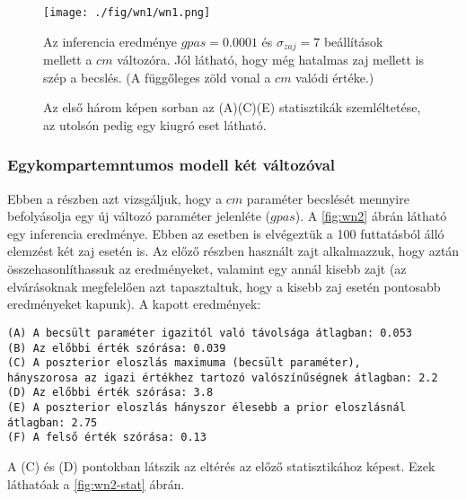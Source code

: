 \begin{figure}[!htb]
	\centering
	\texttt{[image: ./fig/wn1/wn1.png]}
	\caption[Egy kompartmentum, fehér zaj, egy paraméter eredmény]{Az inferencia eredménye $gpas = 0.0001$ és $\sigma_{zaj} = 7$ beállítások mellett a $cm$ változóra. Jól látható, hogy még hatalmas zaj mellett is szép a becslés. (A függőleges zöld vonal a $cm$ valódi értéke.)}
	\label{fig:wn1}
\end{figure}

\begin{figure}
	\hfill
	\hfill
	\hfill
	\vfill
	\hfill
	\caption[Egykompartmentum, fehér zaj, egy paraméter statisztika]{Az első három képen sorban az (A)(C)(E) statisztikák szemléltetése, az utolsón pedig egy kiugró eset látható.}%
	\label{fig:wn1-stat}
\end{figure}



\FloatBarrier
\subsubsection{Egykompartemntumos modell két változóval}
Ebben a részben azt vizsgáljuk, hogy a $cm$ paraméter becslését mennyire befolyásolja egy új változó paraméter jelenléte ($gpas$).
A \ref{fig:wn2} ábrán látható egy inferencia eredménye. Ebben az esetben is elvégeztük a 100 futtatásból álló elemzést két zaj esetén is. Az előző részben használt zajt alkalmazzuk, hogy aztán összehasonlíthassuk az eredményeket, valamint egy annál kisebb zajt (az elvárásoknak megfelelően azt tapasztaltuk, hogy a kisebb zaj esetén pontosabb eredményeket kapunk). A kapott eredmények:
\begin{verbatim}
(A) A becsült paraméter igazitól való távolsága átlagban: 0.053
(B) Az előbbi érték szórása: 0.039
(C) A poszterior eloszlás maximuma (becsült paraméter), 
hányszorosa az igazi értékhez tartozó valószínűségnek átlagban: 2.2
(D) Az előbbi érték szórása: 3.8
(E) A poszterior eloszlás hányszor élesebb a prior eloszlásnál átlagban: 2.75
(F) A felső érték szórása: 0.13
\end{verbatim}
A (C) és (D) pontokban látszik az eltérés az előző statisztikához képest. Ezek láthatóak a \ref{fig:wn2-stat} ábrán.

